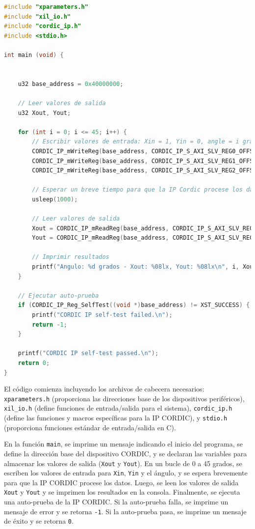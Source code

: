 \documentclass[12pt,a4paper, twoside]{article} %
\begin{document}
\begin{lstlisting}[language=C, caption={Código para validar el uso de IP cores propios}, label={lst:cordic_validation}, basicstyle=\ttfamily\footnotesize, keywordstyle=\color{blue}]
#include "xparameters.h"
#include "xil_io.h"
#include "cordic_ip.h"
#include <stdio.h>

int main (void) {


    u32 base_address = 0x40000000; 

    // Leer valores de salida
    u32 Xout, Yout;

    for (int i = 0; i <= 45; i++) {
        // Escribir valores de entrada: Xin = 1, Yin = 0, angle = i grados
        CORDIC_IP_mWriteReg(base_address, CORDIC_IP_S_AXI_SLV_REG0_OFFSET, 1); 
        CORDIC_IP_mWriteReg(base_address, CORDIC_IP_S_AXI_SLV_REG1_OFFSET, 0);  
        CORDIC_IP_mWriteReg(base_address, CORDIC_IP_S_AXI_SLV_REG2_OFFSET, i << 30);

        // Esperar un breve tiempo para que la IP Cordic procese los datos
        usleep(1000);

        // Leer valores de salida
        Xout = CORDIC_IP_mReadReg(base_address, CORDIC_IP_S_AXI_SLV_REG3_OFFSET);  
        Yout = CORDIC_IP_mReadReg(base_address, CORDIC_IP_S_AXI_SLV_REG4_OFFSET);  

        // Imprimir resultados
        printf("Angulo: %d grados - Xout: %08lx, Yout: %08lx\n", i, Xout, Yout);
    }

    // Ejecutar auto-prueba
    if (CORDIC_IP_Reg_SelfTest((void *)base_address) != XST_SUCCESS) {
        printf("CORDIC IP self-test failed.\n");
        return -1;
    }

    printf("CORDIC IP self-test passed.\n");
    return 0;
}
\end{lstlisting}

El código comienza incluyendo los archivos de cabecera necesarios: \texttt{xparameters.h} (proporciona las direcciones base de los dispositivos periféricos), \texttt{xil\_io.h} (define funciones de entrada/salida para el sistema), \texttt{cordic\_ip.h} (define las funciones y macros específicas para la IP CORDIC), y \texttt{stdio.h} (proporciona funciones estándar de entrada/salida en C). 

En la función \texttt{main}, se imprime un mensaje indicando el inicio del programa, se define la dirección base del dispositivo CORDIC, y se declaran las variables para almacenar los valores de salida (\texttt{Xout} y \texttt{Yout}). En un bucle de 0 a 45 grados, se escriben los valores de entrada para \texttt{Xin}, \texttt{Yin} y el ángulo, y se espera brevemente para que la IP CORDIC procese los datos. Luego, se leen los valores de salida \texttt{Xout} y \texttt{Yout} y se imprimen los resultados en la consola. Finalmente, se ejecuta una auto-prueba de la IP CORDIC. Si la auto-prueba falla, se imprime un mensaje de error y se retorna \texttt{-1}. Si la auto-prueba pasa, se imprime un mensaje de éxito y se retorna \texttt{0}.
\end{document}
